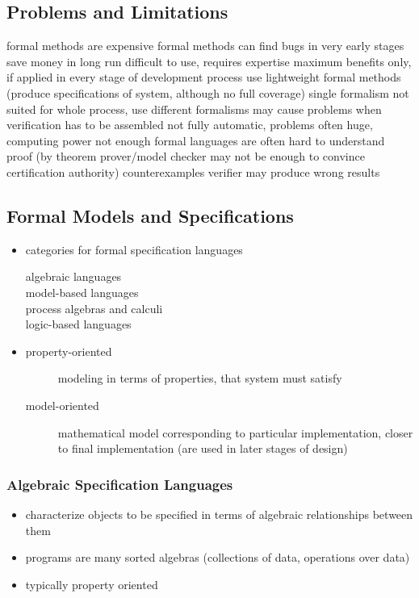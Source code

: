 \documentclass[a4paper, 10pt]{article}
\begin{document}
\subsection*{Problems and Limitations}
\begin{itemize}
    \bad formal methods are expensive
    \good formal methods can find bugs in very early stages \follows save money in long run
    \bad difficult to use, requires expertise
    \bad maximum benefits only, if applied in every stage of development process
    \good use lightweight formal methods (produce specifications of system, although no full coverage)
    \bad single formalism not suited for whole process, use different formalisms \follows may cause problems when verification has to be assembled
    \bad not fully automatic, problems often huge, computing power not enough
    \bad formal languages are often hard to understand
    \bad proof (by theorem prover/model checker may not be enough to convince certification authority)
    \good counterexamples
    \bad verifier may produce wrong results
\end{itemize}

\subsection*{Formal Models and Specifications}
\begin{itemize}
    \item categories for formal specification languages
    \begin{description}
        \item[algebraic languages]
        \item[model-based languages]
        \item[process algebras and calculi]
        \item[logic-based languages]
    \end{description}
    \item
    \begin{description}
        \item[property-oriented] modeling in terms of properties, that system must satisfy
        \item[model-oriented] mathematical model corresponding to particular implementation, closer to final implementation {\tiny (are used in later stages of design)}
    \end{description}
\end{itemize}

\subsubsection{Algebraic Specification Languages}
\begin{itemize}
    \item characterize objects to be specified in terms of algebraic relationships between them
    \item programs are many sorted algebras (collections of data, operations over data)
    \item typically property oriented
\end{itemize}
\end{document}
